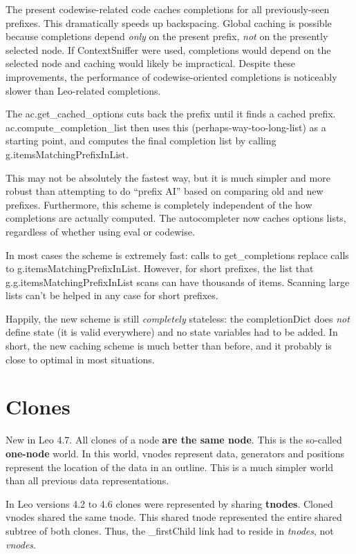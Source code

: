 \documentclass[a4paper,10pt,english]{sphinxmanual}
\begin{document}
The present codewise-related code caches completions for all
previously-seen prefixes. This dramatically speeds up backspacing. Global
caching is possible because completions depend \emph{only} on the present
prefix, \emph{not} on the presently selected node. If ContextSniffer were used,
completions would depend on the selected node and caching would likely be
impractical. Despite these improvements, the performance of
codewise-oriented completions is noticeably slower than Leo-related
completions.

The ac.get\_cached\_options cuts back the prefix until it finds a cached
prefix. ac.compute\_completion\_list then uses this
(perhaps-way-too-long-list) as a starting point, and computes the final
completion list by calling g.itemsMatchingPrefixInList.

This may not be absolutely the fastest way, but it is much simpler and more
robust than attempting to do ``prefix AI'' based on comparing old and new
prefixes. Furthermore, this scheme is completely independent of the how
completions are actually computed. The autocompleter now caches options
lists, regardless of whether using eval or codewise.

In most cases the scheme is extremely fast: calls to get\_completions
replace calls to g.itemsMatchingPrefixInList. However, for short prefixes,
the list that g.g.itemsMatchingPrefixInList scans can have thousands of
items. Scanning large lists can't be helped in any case for short prefixes.

Happily, the new scheme is still \emph{completely} stateless: the completionDict
does \emph{not} define state (it is valid everywhere) and no state variables had
to be added. In short, the new caching scheme is much better than before,
and it probably is close to optimal in most situations.


\section{Clones}
\label{theory:clones}
New in Leo 4.7. All clones of a node \textbf{are the same node}. This is the
so-called \textbf{one-node} world. In this world, vnodes represent data, generators
and positions represent the location of the data in an outline.  This is a much
simpler world than all previous data representations.

In Leo versions 4.2 to 4.6 clones were represented by sharing \textbf{tnodes}. Cloned
vnodes shared the same tnode. This shared tnode represented the entire shared
subtree of both clones. Thus, the \_firstChild link had to reside in
\emph{tnodes}, not \emph{vnodes}.
\end{document}
